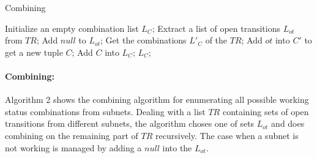 \documentclass{lncs/llncs}
\begin{document}
%
%

\begin{algorithm}
\caption{Combining}
\begin{algorithmic}[1]

\State Initialize an empty combination list $L_C$;
\State Extract a list of open transitions $L_{ot}$ from $TR$;
\State Add $null$ to $L_{ot}$;
\State Get the combinations $L'_C$ of the $TR$;
		\State Add $ot$ into $C'$ to get a new tuple $C$;
		\State Add $C$ into $L_C$;
	\EndFor
\EndFor 
\State \Return $L_C$;

\end{algorithmic}  
\end{algorithm}

\paragraph{Combining:}
Algorithm 2 shows the combining algorithm for enumerating all possible
working status combinations from subnets. Dealing with a list $TR$
containing  sets of open transitions from different subnets,
the algorithm choses one of sets $L_{ot}$ and does combining on the
remaining part of $TR$ recursively. The case when a subnet is not working is
managed by adding a $null$ into the $L_{ot}$.
\end{document}
